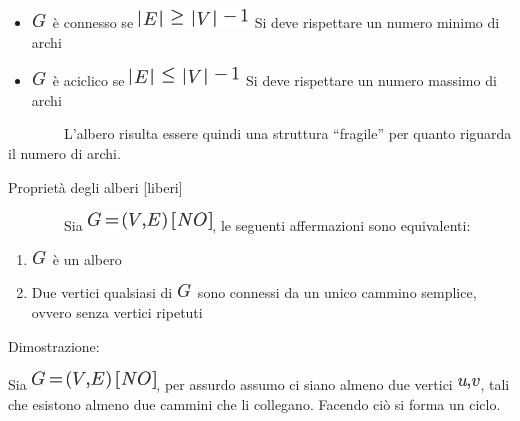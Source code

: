 \documentclass{article}
\providecommand{\tightlist}{%
  \setlength{\itemsep}{0pt}\setlength{\parskip}{0pt}}
\begin{document}
\begin{itemize}
\tightlist
\item
  \includegraphics{images/image340.png}{~è connesso se
  }\includegraphics{images/image440.png}{~Si deve rispettare un numero
  minimo di archi}
\item
  \includegraphics{images/image340.png}{~è aciclico se
  }\includegraphics{images/image441.png}{~Si deve rispettare un numero
  massimo di archi}
\end{itemize}

{~~~~~~~~L'albero risulta essere quindi una struttura ``fragile'' per
quanto riguarda il numero di archi.}

{}

{}

{Proprietà degli alberi {[}liberi{]}}

{~~~~~~~~Sia }\includegraphics{images/image420.png}{, le seguenti
affermazioni sono equivalenti:}

\begin{enumerate}
\tightlist
\item
  \includegraphics{images/image340.png}{~è un albero}
\item
  {Due vertici qualsiasi di }\includegraphics{images/image340.png}{~sono
  connessi da un unico cammino semplice, ovvero senza vertici ripetuti}
\end{enumerate}

{}

{Dimostrazione}{:~~~~~~~~}

{Sia }\includegraphics{images/image420.png}{, per assurdo assumo ci
siano almeno due vertici }\includegraphics{images/image442.png}{, tali
che esistono almeno due cammini che li collegano. Facendo ciò si forma
un ciclo.}
\end{document}
